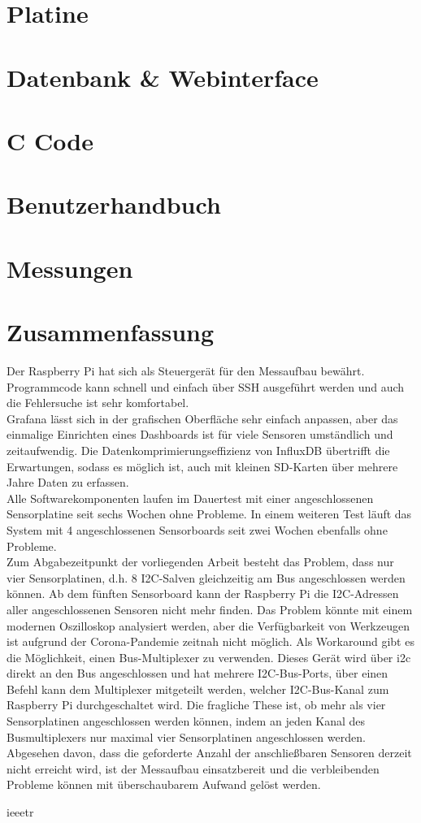 \documentclass[a4paper,oneside,12pt,titlepage]{scrartcl}   %
\begin{document}
\section{Platine}

\newpage
\section{Datenbank \& Webinterface}

\newpage
\section{C Code}

\newpage
\section{Benutzerhandbuch}

\newpage
\section{Messungen}

\newpage
\section{Zusammenfassung}
Der Raspberry Pi hat sich als Steuergerät für den Messaufbau bewährt.
Programmcode kann schnell und einfach über SSH ausgeführt werden und auch die Fehlersuche ist sehr komfortabel.\\
Grafana lässt sich in der grafischen Oberfläche sehr einfach anpassen, aber das einmalige Einrichten eines Dashboards ist für viele Sensoren umständlich und zeitaufwendig.
Die Datenkomprimierungseffizienz von InfluxDB übertrifft die Erwartungen, sodass es möglich ist, auch mit kleinen SD-Karten über mehrere Jahre Daten zu erfassen.\\
Alle Softwarekomponenten laufen im Dauertest mit einer angeschlossenen Sensorplatine seit sechs Wochen ohne Probleme.
In einem weiteren Test läuft das System mit 4 angeschlossenen Sensorboards seit zwei Wochen ebenfalls ohne Probleme.\\
Zum Abgabezeitpunkt der vorliegenden Arbeit besteht das Problem, dass nur vier Sensorplatinen, d.h. 8 I2C-Salven gleichzeitig am Bus angeschlossen werden können.
Ab dem fünften Sensorboard kann der Raspberry Pi die I2C-Adressen aller angeschlossenen Sensoren nicht mehr finden.
Das Problem könnte mit einem modernen Oszilloskop analysiert werden, aber die Verfügbarkeit von Werkzeugen ist aufgrund der Corona-Pandemie zeitnah nicht möglich.
Als Workaround gibt es die Möglichkeit, einen Bus-Multiplexer zu verwenden.
Dieses Gerät wird über i2c direkt an den Bus angeschlossen und hat mehrere I2C-Bus-Ports, über einen Befehl kann dem Multiplexer mitgeteilt werden, welcher I2C-Bus-Kanal zum Raspberry Pi durchgeschaltet wird.
Die fragliche These ist, ob mehr als vier Sensorplatinen angeschlossen werden können, indem an jeden Kanal des Busmultiplexers nur maximal vier Sensorplatinen angeschlossen werden.\\
Abgesehen davon, dass die geforderte Anzahl der anschließbaren Sensoren derzeit nicht erreicht wird, ist der Messaufbau einsatzbereit und die verbleibenden Probleme können mit überschaubarem Aufwand gelöst werden.


 {ieeetr}
\end{document}
